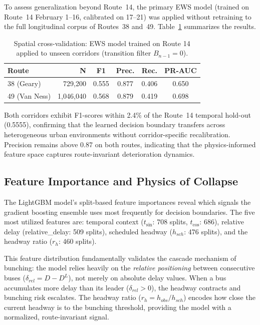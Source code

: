 \documentclass[fleqn,10pt,lineno]{wlpeerj}
\begin{document}
To assess generalization beyond Route~14, the primary EWS model (trained on Route~14 February 1--16, calibrated on 17--21) was applied without retraining to the full longitudinal corpus of Routes~38 and~49. Table~\ref{tab:spatial_cv} summarizes the results.

\begin{table}[htbp]
  \caption{Spatial cross-validation: EWS model trained on Route 14 applied to unseen corridors (transition filter $B_{n-1}=0$).}
  \centering
  \begin{tabular}{@{}lrcccc@{}}
    \toprule
    \textbf{Route} & \textbf{N} & \textbf{F1} & \textbf{Prec.} & \textbf{Rec.} & \textbf{PR-AUC} \\ \midrule
    38 (Geary)   & 729{,}200  & 0.555 & 0.877 & 0.406 & 0.650 \\
    49 (Van Ness) & 1{,}046{,}040 & 0.568 & 0.879 & 0.419 & 0.698 \\ \bottomrule
  \end{tabular}
  \label{tab:spatial_cv}
\end{table}

Both corridors exhibit F1-scores within 2.4\% of the Route~14 temporal hold-out (0.5555), confirming that the learned decision boundary transfers across heterogeneous urban environments without corridor-specific recalibration. Precision remains above 0.87 on both routes, indicating that the physics-informed feature space captures route-invariant deterioration dynamics.

\subsection{Feature Importance and Physics of Collapse}

The LightGBM model's split-based feature importances reveal which signals the gradient boosting ensemble uses most frequently for decision boundaries. The five most utilized features are: temporal context ($t_{\sin}$: 708 splits, $t_{\cos}$: 686), relative delay (relative\_delay: 509 splits), scheduled headway ($h_{sch}$: 476 splits), and the headway ratio ($r_h$: 460 splits).

This feature distribution fundamentally validates the cascade mechanism of bunching: the model relies heavily on the \textit{relative positioning} between consecutive buses ($\delta_{rel} = D - D^{L}$), not merely on absolute delay values. When a bus accumulates more delay than its leader ($\delta_{rel} > 0$), the headway contracts and bunching risk escalates. The headway ratio ($r_h = h_{obs}/h_{sch}$) encodes how close the current headway is to the bunching threshold, providing the model with a normalized, route-invariant signal.
\end{document}
